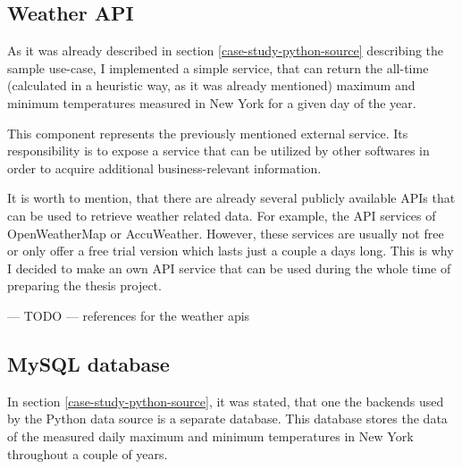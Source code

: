 \subsection{Weather API}

As it was already described in section \ref{case-study-python-source} describing the sample use-case, I implemented a simple service, that can return the all-time (calculated in a heuristic way, as it was already mentioned) maximum and minimum temperatures measured in New York for a given day of the year.

This component represents the previously mentioned external service. Its responsibility is to expose a service that can be utilized by other softwares in order to acquire additional business-relevant information.

It is worth to mention, that there are already several publicly available APIs that can be used to retrieve weather related data. For example, the API services of OpenWeatherMap or AccuWeather. However, these services are usually not free or only offer a free trial version which lasts just a couple a days long. This is why I decided to make an own API service that can be used during the whole time of preparing the thesis project.


\begin{center}
	--- TODO ---
	references for the weather apis
\end{center}

\subsection{MySQL database}

In section \ref{case-study-python-source}, it was stated, that one the backends used by the Python data source is a separate database. This database stores the data of the measured daily maximum and minimum temperatures in New York throughout a couple of years.



